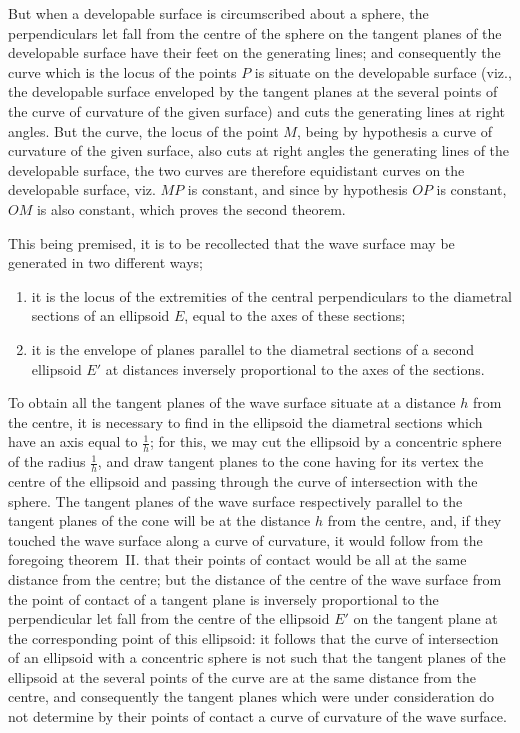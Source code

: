 \documentclass[11pt,a4paper]{article}
\theoremstyle{plain}
\begin{document}
But when a developable surface is circumscribed about a sphere, the perpendiculars let fall from the centre of the sphere on the tangent planes of the developable surface have their feet on the generating lines; and consequently the curve which is the locus of the points $P$ is situate on the developable surface (viz., the developable surface enveloped by the tangent planes at the several points of the curve of curvature of the given surface) and cuts the generating lines at right angles. But the curve, the locus of the point $M$, being by hypothesis a curve of curvature of the given surface, also cuts at right angles the generating lines of the developable surface, the two curves are therefore equidistant curves on the developable surface, viz. $MP$ is constant, and since by hypothesis $OP$ is constant, $OM$ is also constant, which proves the second theorem.

This being premised, it is to be recollected that the wave surface may be generated in two different ways;
\begin{enumerate}
    \item[$1^\circ$] it is the locus of the extremities of the central perpendiculars to the diametral sections of an ellipsoid $E$, equal to the axes of these sections;
    \item[$2^\circ$] it is the envelope of planes parallel to the diametral sections of a second ellipsoid $E'$ at distances inversely proportional to the axes of the sections.
\end{enumerate}
To obtain all the tangent planes of the wave surface situate at a distance $h$ from the centre, it is necessary to find in the ellipsoid the diametral sections which have an axis equal to $\frac{1}{h}$; for this, we may cut the ellipsoid by a concentric sphere of the radius $\frac{1}{h}$, and draw tangent planes to the cone having for its vertex the centre of the ellipsoid and passing through the curve of intersection with the sphere. The tangent planes of the wave surface respectively parallel to the tangent planes of the cone will be at the distance $h$ from the centre, and, if they touched the wave surface along a curve of curvature, it would follow from the foregoing theorem~II. that their points of contact would be all at the same distance from the centre; but the distance of the centre of the wave surface from the point of contact of a tangent plane is inversely proportional to the perpendicular let fall from the centre of the ellipsoid $E'$ on the tangent plane at the corresponding point of this ellipsoid: it follows that the curve of intersection of an ellipsoid with a concentric sphere is not such that the tangent planes of the ellipsoid at the several points of the curve are at the same distance from the centre, and consequently the tangent planes which were under consideration do not determine by their points of contact a curve of curvature of the wave surface.
\end{document}

